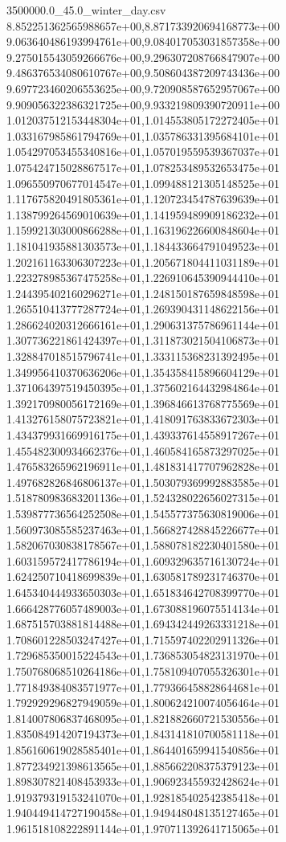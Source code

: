 \begin{filecontents*}{3500000.0_45.0_winter_day.csv}
8.852251362565988657e+00,8.871733920694168773e+00
9.063640486193994761e+00,9.084017053031857358e+00
9.275015543059266676e+00,9.296307208766847907e+00
9.486376534080610767e+00,9.508604387209743436e+00
9.697723460206553625e+00,9.720908587652957067e+00
9.909056322386321725e+00,9.933219809390720911e+00
1.012037512153448304e+01,1.014553805172272405e+01
1.033167985861794769e+01,1.035786331395684101e+01
1.054297053455340816e+01,1.057019559539367037e+01
1.075424715028867517e+01,1.078253489532653475e+01
1.096550970677014547e+01,1.099488121305148525e+01
1.117675820491805361e+01,1.120723454787639639e+01
1.138799264569010639e+01,1.141959489909186232e+01
1.159921303000866288e+01,1.163196226600848604e+01
1.181041935881303573e+01,1.184433664791049523e+01
1.202161163306307223e+01,1.205671804411031189e+01
1.223278985367475258e+01,1.226910645390944410e+01
1.244395402160296271e+01,1.248150187659848598e+01
1.265510413777287724e+01,1.269390431148622156e+01
1.286624020312666161e+01,1.290631375786961144e+01
1.307736221861424397e+01,1.311873021504106873e+01
1.328847018515796741e+01,1.333115368231392495e+01
1.349956410370636206e+01,1.354358415896604129e+01
1.371064397519450395e+01,1.375602164432984864e+01
1.392170980056172169e+01,1.396846613768775569e+01
1.413276158075723821e+01,1.418091763833672303e+01
1.434379931669916175e+01,1.439337614558917267e+01
1.455482300934662376e+01,1.460584165873297025e+01
1.476583265962196911e+01,1.481831417707962828e+01
1.497682826846806137e+01,1.503079369992883585e+01
1.518780983683201136e+01,1.524328022656027315e+01
1.539877736564252508e+01,1.545577375630819006e+01
1.560973085585237463e+01,1.566827428845226677e+01
1.582067030838178567e+01,1.588078182230401580e+01
1.603159572417786194e+01,1.609329635716130724e+01
1.624250710418699839e+01,1.630581789231746370e+01
1.645340444933650303e+01,1.651834642708399770e+01
1.666428776057489003e+01,1.673088196075514134e+01
1.687515703881814488e+01,1.694342449263331218e+01
1.708601228503247427e+01,1.715597402202911326e+01
1.729685350015224543e+01,1.736853054823131970e+01
1.750768068510264186e+01,1.758109407055326301e+01
1.771849384083571977e+01,1.779366458828644681e+01
1.792929296827949059e+01,1.800624210074056464e+01
1.814007806837468095e+01,1.821882660721530556e+01
1.835084914207194373e+01,1.843141810700581118e+01
1.856160619028585401e+01,1.864401659941540856e+01
1.877234921398613565e+01,1.885662208375379123e+01
1.898307821408453933e+01,1.906923455932428624e+01
1.919379319153241070e+01,1.928185402542385418e+01
1.940449414727190458e+01,1.949448048135127465e+01
1.961518108222891144e+01,1.970711392641715065e+01

\end{filecontents*}
